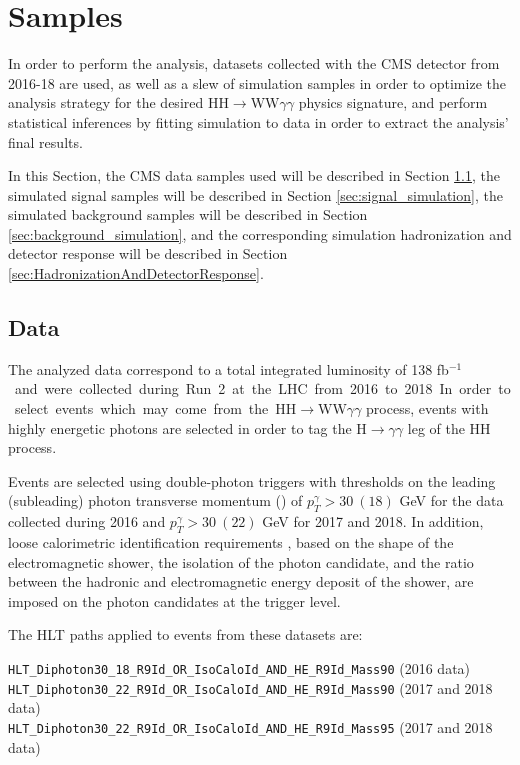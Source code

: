 \section{Samples} \label{sec:samples}

In order to perform the analysis, datasets collected with the CMS detector from 2016-18 are used, as well as a slew of simulation samples in order to optimize the analysis strategy for the desired HH$\rightarrow$WW$\gamma\gamma$ physics signature, and perform statistical inferences by fitting simulation to data in order to extract the analysis' final results. 

In this Section, the CMS data samples used will be described in Section \ref{sec:data_samples}, the simulated signal samples will be described in Section \ref{sec:signal_simulation}, the simulated background samples will be described in Section \ref{sec:background_simulation}, and the corresponding simulation hadronization and detector response will be described in Section \ref{sec:HadronizationAndDetectorResponse}. 

\subsection{Data} \label{sec:data_samples}

The analyzed data correspond to a total integrated luminosity of 138 \unit{fb$^{-1}$} and were collected during Run 2 at the LHC from 2016 to 2018. In order to select events which may come from the HH$\rightarrow$WW$\gamma\gamma$ process, events with highly energetic photons are selected in order to tag the H$\rightarrow\gamma\gamma$ leg of the HH process.

Events are selected using double-photon triggers with thresholds on the leading (subleading) photon transverse momentum (\pt) of $p_T^{\gamma} > 30 \ (18)$ GeV
for the data collected during 2016
and $p_T^{\gamma} > 30 \ (22)$ GeV for 2017 and 2018.
In addition, loose calorimetric identification requirements \cite{Sirunyan:2018ouh}, based
on the shape of the electromagnetic shower, the isolation of the photon candidate, and the ratio
between the hadronic and electromagnetic energy deposit of the shower, are imposed on the
photon candidates at the trigger level.

The HLT paths applied to events from these datasets are:

\begin{center}
        {\tt HLT\_Diphoton30\_18\_R9Id\_OR\_IsoCaloId\-\_AND\_HE\_R9Id\_Mass90} (2016 data) \\ 
        {\tt HLT\_Diphoton30\_22\_R9Id\_OR\_IsoCaloId\-\_AND\_HE\_R9Id\_Mass90} (2017 and 2018 data) \\
        {\tt HLT\_Diphoton30\_22\_R9Id\_OR\_IsoCaloId\-\_AND\_HE\_R9Id\_Mass95} (2017 and 2018 data) \\ 
\end{center}

